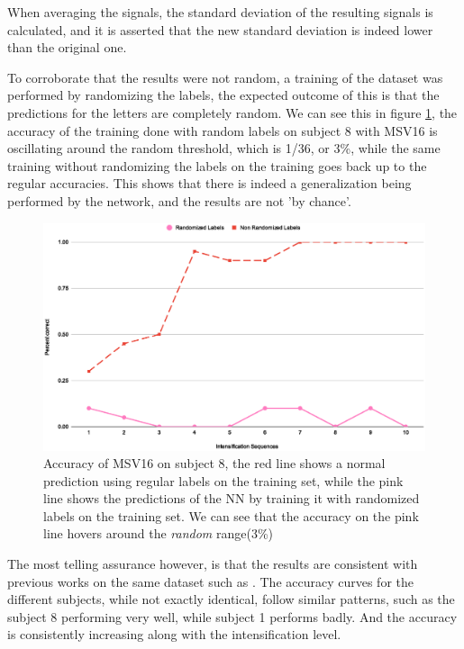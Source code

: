\documentclass[conference]{IEEEtran}
\begin{document}
When averaging the signals, the standard deviation of the resulting signals is calculated, and it is asserted that the new standard deviation is indeed lower than the original one.

To corroborate that the results were not random, a training of the dataset was performed by randomizing the labels, the expected outcome of this is that the predictions for the letters are completely random. We can see this in figure \ref{image:randomlabels}, the accuracy of the training done with random labels on subject 8 with MSV16 is oscillating around the random threshold, which is 1/36, or 3\%, while the same training without randomizing the labels on the training goes back up to the regular accuracies. This shows that there is indeed a generalization being performed by the network, and the results are not 'by chance'.

\begin{figure}[htb]
  \centering
  \includegraphics[width=\linewidth]{images/randomlabels.eps}
  \caption[Random Labels Accuracy]{Accuracy of MSV16 on subject 8, the red line shows a normal prediction using regular labels on the training set, while the pink line shows the predictions of the NN by training it with randomized labels on the training set. We can see that the accuracy on the pink line hovers around the \emph{random} range(3\%)}
  \label{image:randomlabels}
\end{figure}

The most telling assurance however, is that the results are consistent with previous works on the same dataset such as \cite{ramele2019histogram}. The accuracy curves for the different subjects, while not exactly identical, follow similar patterns, such as the subject 8 performing very well, while subject 1 performs badly. And the accuracy is consistently increasing along with the intensification level.
\end{document}
